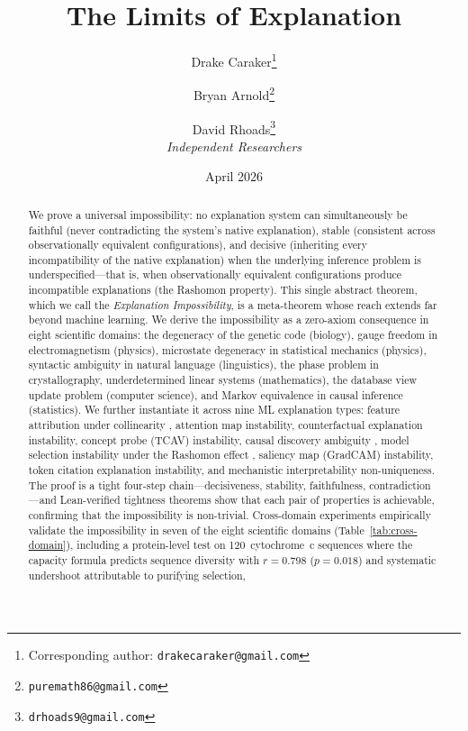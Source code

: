 \documentclass[11pt,a4paper]{article}
\title{The Limits of Explanation}
\author{%
  Drake Caraker\thanks{Corresponding author: \texttt{drakecaraker@gmail.com}}
  \and
  Bryan Arnold\thanks{\texttt{puremath86@gmail.com}}
  \and
  David Rhoads\thanks{\texttt{drhoads9@gmail.com}}
  \\[8pt]
  \textit{Independent Researchers}
}
\date{April 2026}
\begin{document}
\maketitle
\thispagestyle{empty}

\begin{abstract}
We prove a universal impossibility: no explanation system can simultaneously be
faithful (never contradicting the system's native explanation), stable
(consistent across observationally equivalent configurations), and decisive
(inheriting every incompatibility of the native explanation) when
the underlying inference problem is underspecified---that is, when
observationally equivalent configurations produce incompatible explanations
(the Rashomon property).
This single abstract theorem, which we call the \emph{Explanation
Impossibility}, is a meta-theorem whose reach extends far beyond machine
learning.  We derive the impossibility as a zero-axiom consequence in
eight scientific domains: the degeneracy of the genetic code (biology),
gauge freedom in electromagnetism (physics), microstate degeneracy in
statistical mechanics (physics), syntactic ambiguity in natural
language (linguistics), the phase problem in crystallography,
underdetermined linear systems (mathematics), the database view update
problem (computer science), and Markov equivalence in causal inference
(statistics).  We further instantiate it across nine ML explanation types:
feature attribution under collinearity
\citep{bilodeau2024impossibility}, attention map instability, counterfactual
explanation instability, concept probe (TCAV) instability, causal discovery
ambiguity \citep{verma1991equivalence}, model selection instability under the
Rashomon effect \citep{rudin2024amazing,fisher2019models}, saliency map
(GradCAM) instability, token citation explanation instability, and
mechanistic interpretability non-uniqueness.
The proof is a tight four-step chain---decisiveness, stability, faithfulness,
contradiction---and Lean-verified tightness theorems show that each pair of
properties is achievable, confirming that the impossibility is non-trivial.
Cross-domain experiments empirically validate the impossibility in seven of
the eight scientific domains (Table~\ref{tab:cross-domain}), including a
protein-level test on 120~cytochrome~c sequences where the capacity
formula predicts sequence diversity with $r = 0.798$ ($p = 0.018$) and
systematic undershoot attributable to purifying selection,

\end{abstract}
\end{document}
